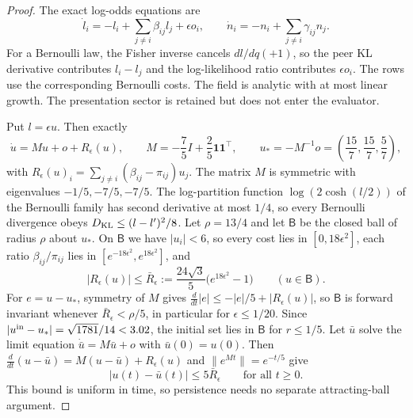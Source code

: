 \begin{proof}
The exact log-odds equations are
\begin{equation}
 \dot l_i=-l_i+\sum_{j\ne i}\beta_{ij}l_j+\epsilon o_i,\qquad
 \dot n_i=-n_i+\sum_{j\ne i}\gamma_{ij}n_j.
 \label{pa:bit-flow}
\end{equation}
For a Bernoulli law, the Fisher inverse cancels $dl/dq(+1)$, so the peer KL derivative contributes $l_i-l_j$ and the log-likelihood ratio contributes $\epsilon o_i$. The rows use the corresponding Bernoulli costs. The field is analytic with at most linear growth. The presentation sector is retained but does not enter the evaluator.

Put $l=\epsilon u$. Then exactly
\begin{equation}
 \dot u=M u+o+R_\epsilon(u),\qquad
 M=-\frac75 I+\frac25\mathbf1\mathbf1^\top,\qquad
 u_*=-M^{-1}o=\left(\frac{15}7,\frac{15}7,\frac57\right),
 \label{pa:bit-limit}
\end{equation}
with $R_\epsilon(u)_i=\sum_{j\ne i}(\beta_{ij}-\pi_{ij})u_j$. The matrix $M$ is symmetric with eigenvalues $-1/5,-7/5,-7/5$. The log-partition function $\log(2\cosh(l/2))$ of the Bernoulli family has second derivative at most $1/4$, so every Bernoulli divergence obeys $D_{\mathrm{KL}}\leq(l-l')^2/8$. Let $\rho=13/4$ and let $\mathsf B$ be the closed ball of radius $\rho$ about $u_*$. On $\mathsf B$ we have $|u_i|<6$, so every cost lies in $[0,18\epsilon^2]$, each ratio $\beta_{ij}/\pi_{ij}$ lies in $[e^{-18\epsilon^2},e^{18\epsilon^2}]$, and
\begin{equation}
 |R_\epsilon(u)|\leq\bar R_\epsilon:=\frac{24\sqrt3}5\bigl(e^{18\epsilon^2}-1\bigr)
 \qquad(u\in\mathsf B).
 \label{pa:bit-remainder}
\end{equation}
For $e=u-u_*$, symmetry of $M$ gives $\frac{d}{dt}|e|\leq-|e|/5+|R_\epsilon(u)|$, so $\mathsf B$ is forward invariant whenever $\bar R_\epsilon<\rho/5$, in particular for $\epsilon\leq1/20$. Since $|u^{\rm in}-u_*|=\sqrt{1781}/14<3.02$, the initial set lies in $\mathsf B$ for $r\leq1/5$. Let $\bar u$ solve the limit equation $\dot{\bar u}=M\bar u+o$ with $\bar u(0)=u(0)$. Then $\frac{d}{dt}(u-\bar u)=M(u-\bar u)+R_\epsilon(u)$ and $\|e^{Mt}\|=e^{-t/5}$ give
\begin{equation}
 |u(t)-\bar u(t)|\leq5\bar R_\epsilon\qquad\text{for all }t\geq0.
 \label{pa:bit-shadow}
\end{equation}
This bound is uniform in time, so persistence needs no separate attracting-ball argument.


\end{proof}
